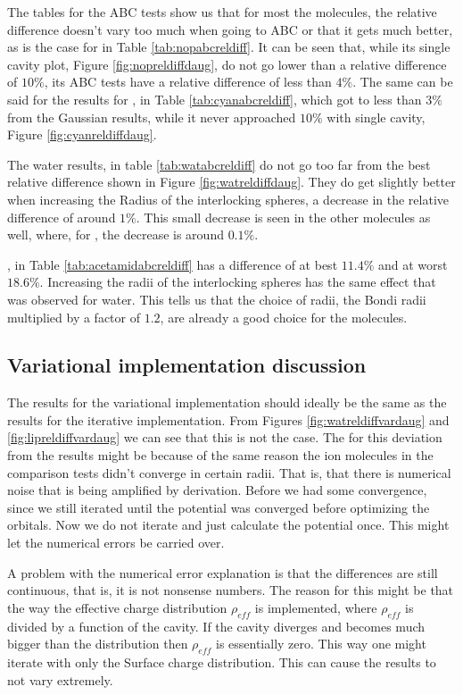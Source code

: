\documentclass[../master_thesis.tex]{subfiles}
\begin{document}
The tables for the \ac{ABC} tests  show us that for most the molecules, the
relative difference doesn't vary too much when going to \ac{ABC} or that it gets
much better, as is the case for  in Table \ref{tab:nopabcreldiff}.
It can be seen that, while its single cavity plot, Figure \ref{fig:nopreldiffdaug}, do not go
lower than a relative difference of $10\%$, its \ac{ABC} tests have a relative difference
of less than $4\%$. The same can be said for the results for , in Table \ref{tab:cyanabcreldiff},
which got to less than $3\%$ from the Gaussian results, while it never approached $10\%$
with single cavity, Figure \ref{fig:cyanreldiffdaug}.

The water results, in table \ref{tab:watabcreldiff} do not go too far from the best relative difference
shown in Figure \ref{fig:watreldiffdaug}. They do get slightly better when increasing
the Radius of the interlocking spheres, a decrease in the relative difference of
around $1\%$. This small decrease is seen in the other molecules as well, where,
for , the decrease is around $0.1\%$.

, in Table \ref{tab:acetamidabcreldiff} has a difference of at
best $11.4\%$ and at worst $18.6\%$. Increasing the radii of the interlocking spheres
has the same effect that was observed for water.  This tells us that the choice of
radii, the Bondi radii multiplied by a factor of $1.2$, are already a good choice
for the molecules.
\subsection{Variational implementation discussion}
The results for the variational implementation should ideally be the same as the results for the
iterative implementation. From Figures \ref{fig:watreldiffvardaug} and \ref{fig:lipreldiffvardaug}
we can see that this is not the case.
The for this deviation from the results might be because of the same reason the ion
molecules in the comparison tests didn't converge in certain radii. That is, that there
is numerical noise that is being amplified by derivation. Before we had some convergence, since
we still iterated until the potential was converged before optimizing the orbitals. Now
we do not iterate and just calculate the potential once. This might let the numerical errors
be carried over.

A problem with the numerical error explanation is that the differences are still
continuous, that is, it is not nonsense numbers. The reason for this might be that
the way the effective charge distribution $\rho_{eff}$ is implemented, where $\rho_{eff}$
is divided by a function of the cavity. If the cavity diverges and becomes much bigger
than the distribution then $\rho_{eff}$ is essentially zero. This way one might iterate
with only the Surface charge distribution. This can cause the results to not vary
extremely.
\end{document}

